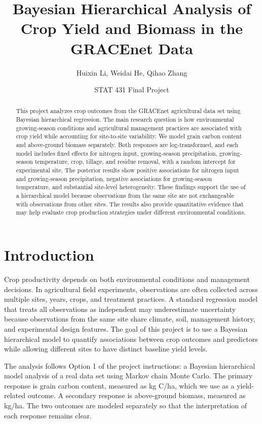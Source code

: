 \documentclass[11pt]{article}
\title{Bayesian Hierarchical Analysis of Crop Yield and Biomass in the GRACEnet Data}
\author{Huixin Li, Weidai He, Qihao Zhang}
\date{STAT 431 Final Project}
\begin{document}
\maketitle

\begin{abstract}
This project analyzes crop outcomes from the GRACEnet agricultural data set using Bayesian hierarchical regression. The main research question is how environmental growing-season conditions and agricultural management practices are associated with crop yield while accounting for site-to-site variability. We model grain carbon content and above-ground biomass separately. Both responses are log-transformed, and each model includes fixed effects for nitrogen input, growing-season precipitation, growing-season temperature, crop, tillage, and residue removal, with a random intercept for experimental site. The posterior results show positive associations for nitrogen input and growing-season precipitation, negative associations for growing-season temperature, and substantial site-level heterogeneity. These findings support the use of a hierarchical model because observations from the same site are not exchangeable with observations from other sites. The results also provide quantitative evidence that may help evaluate crop production strategies under different environmental conditions.
\end{abstract}

\section{Introduction}

Crop productivity depends on both environmental conditions and management decisions. In agricultural field experiments, observations are often collected across multiple sites, years, crops, and treatment practices. A standard regression model that treats all observations as independent may underestimate uncertainty because observations from the same site share climate, soil, management history, and experimental design features. The goal of this project is to use a Bayesian hierarchical model to quantify associations between crop outcomes and predictors while allowing different sites to have distinct baseline yield levels.

The analysis follows Option 1 of the project instructions: a Bayesian hierarchical model analysis of a real data set using Markov chain Monte Carlo. The primary response is grain carbon content, measured as kg C/ha, which we use as a yield-related outcome. A secondary response is above-ground biomass, measured as kg/ha. The two outcomes are modeled separately so that the interpretation of each response remains clear.
\end{document}
